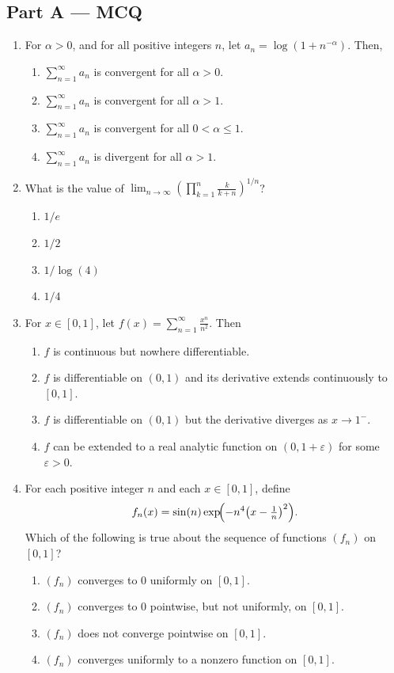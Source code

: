 \documentclass[11pt, a4paper]{article}
\begin{document}
\subsection*{Part A --- MCQ}
\begin{enumerate}
\item For $\alpha>0$, and for all positive integers $n$, let $a_n=\log(1+n^{-\alpha})$. Then,
\begin{enumerate}[label=(\alph*)]
\item $\sum_{n=1}^\infty a_n$ is convergent for all $\alpha>0$.
\item $\sum_{n=1}^\infty a_n$ is convergent for all $\alpha>1$.
\item $\sum_{n=1}^\infty a_n$ is convergent for all $0<\alpha\le1$.
\item $\sum_{n=1}^\infty a_n$ is divergent for all $\alpha>1$.
\end{enumerate}

\item What is the value of $\displaystyle\lim_{n\to\infty}\left(\prod_{k=1}^n\frac{k}{k+n}\right)^{1/n}$?
\begin{enumerate}[label=(\alph*)]
\item $1/e$ \item $1/2$ \item $1/\log(4)$ \item $1/4$
\end{enumerate}

\item For $x\in[0,1]$, let $f(x)=\displaystyle\sum_{n=1}^\infty\frac{x^n}{n^2}$. Then
\begin{enumerate}[label=(\alph*)]
\item $f$ is continuous but nowhere differentiable.
\item $f$ is differentiable on $(0,1)$ and its derivative extends continuously to $[0,1]$.
\item $f$ is differentiable on $(0,1)$ but the derivative diverges as $x\to1^-$.
\item $f$ can be extended to a real analytic function on $(0,1+\varepsilon)$ for some $\varepsilon>0$.
\end{enumerate}

\item For each positive integer $n$ and each $x\in[0,1]$, define
\[ f_n(x)=\sin(n)\exp\!\Bigl(-n^4\bigl(x-\tfrac1n\bigr)^2\Bigr). \]
Which of the following is true about the sequence of functions $(f_n)$ on $[0,1]$?
\begin{enumerate}[label=(\alph*)]
\item $(f_n)$ converges to $0$ uniformly on $[0,1]$.
\item $(f_n)$ converges to $0$ pointwise, but not uniformly, on $[0,1]$.
\item $(f_n)$ does not converge pointwise on $[0,1]$.
\item $(f_n)$ converges uniformly to a nonzero function on $[0,1]$.
\end{enumerate}


\end{enumerate}
\end{document}
